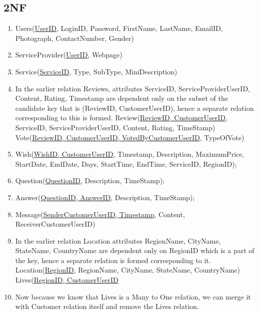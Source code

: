 \documentclass[a4paper]{article}
\begin{document}
\subsection{2NF}
\begin{enumerate}

\item Users(\underline{UserID}, LoginID, Password, FirstName, LastName, EmailID, Photograph, ContactNumber, Gender)



\item ServiceProvider(\underline{UserID}, Webpage)

\item Service(\underline{ServiceID}, Type, SubType, MiniDescription)

\item In the earlier relation Reviews, attributes ServiceID, ServiceProviderUserID, Content, Rating, Timestamp are dependent only on the subset of the candidate key that is (ReviewID, CustomerUserID), hence a separate relation corresponding to this is formed.
\subitem Review(\underline{ReviewID, CustomerUserID}, ServiceID, ServiceProviderUserID, Content, Rating, TimeStamp)
\subitem Vote(\underline{ReviewID, CustomerUserID, VotedByCustomerUserID}, TypeOfVote)

\item Wish(\underline{WishID, CustomerUserID}, Timestamp, Description, MaximumPrice, StartDate, EndDate, Days, StartTime, EndTime, ServiceID, RegionID);

\item Question(\underline{QuestionID}, Description, TimeStamp);

\item Answer(\underline{QuestionID, AnswerID}, Description, TimeStamp);

\item Message(\underline {SenderCustomerUserID, Timestamp}, Content, ReceiverCustomerUserID)

\item In the earlier relation Location attributes RegionName, CityName, StateName, CountryName are dependent only on RegionID which is a part of the key, hence a separate relation is formed corresponding to it.
\subitem Location(\underline{RegionID}, RegionName, CityName, StateName, CountryName)
\subitem Lives(\underline{RegionID, CustomerUserID}

\item
Now because we know that Lives is a Many to One relation, we can merge it with Customer relation itself and remove the Lives relation.


\end{enumerate}
\end{document}
